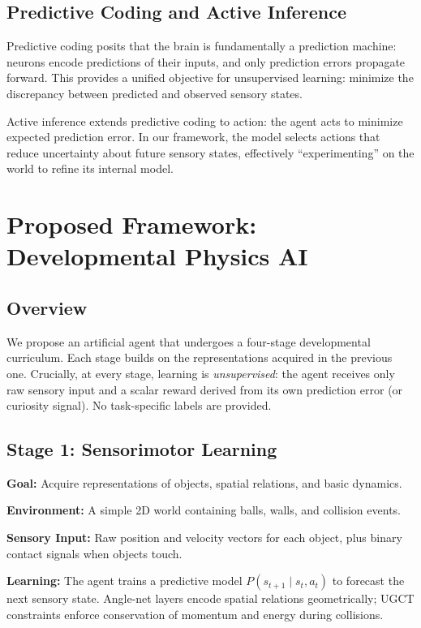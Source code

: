\documentclass[11pt,oneside]{article}
\begin{document}
\subsection{Predictive Coding and Active Inference}

Predictive coding \citep{friston2005theory} posits that the brain is fundamentally a prediction machine: neurons encode predictions of their inputs, and only prediction errors propagate forward. This provides a unified objective for unsupervised learning: minimize the discrepancy between predicted and observed sensory states.

Active inference \citep{friston2010free} extends predictive coding to action: the agent acts to minimize expected prediction error. In our framework, the model selects actions that reduce uncertainty about future sensory states, effectively ``experimenting'' on the world to refine its internal model.

\section{Proposed Framework: Developmental Physics AI}

\subsection{Overview}

We propose an artificial agent that undergoes a four-stage developmental curriculum. Each stage builds on the representations acquired in the previous one. Crucially, at every stage, learning is \emph{unsupervised}: the agent receives only raw sensory input and a scalar reward derived from its own prediction error (or curiosity signal). No task-specific labels are provided.

\subsection{Stage 1: Sensorimotor Learning}

\textbf{Goal:} Acquire representations of objects, spatial relations, and basic dynamics.

\textbf{Environment:} A simple 2D world containing balls, walls, and collision events.

\textbf{Sensory Input:} Raw position and velocity vectors for each object, plus binary contact signals when objects touch.

\textbf{Learning:} The agent trains a predictive model $P(s_{t+1} \mid s_t, a_t)$ to forecast the next sensory state. Angle-net layers encode spatial relations geometrically; UGCT constraints enforce conservation of momentum and energy during collisions.
\end{document}

